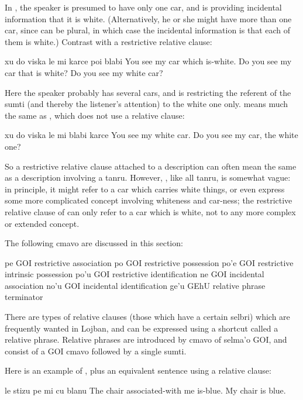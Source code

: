 In , the speaker is presumed
    to have only one car, and is providing incidental information
    that it is white. (Alternatively, he or she might have more
    than one car, since  can be plural, in which case
    the incidental information is that each of them is white.)
    Contrast  with a restrictive
    relative clause:
\begin{example}
xu do viska le mi karce poi blabi\n
{} You see my car which is-white.\n
Do you see my car that is white?\n
Do you see my white car?
\end{example}

Here the speaker probably has several cars, and is restricting
    the referent of the sumti  (and thereby the
    listener's attention) to the white one only.  means much the same as , which does not use a relative
    clause:
\begin{example}
xu do viska le mi blabi karce\n
{} You see my white car.\n
Do you see my car, the white one?
\end{example}

So a restrictive relative clause attached to a description can
    often mean the same as a description involving a tanru.
    However, , like all tanru, is somewhat vague: in
    principle, it might refer to a car which carries white things,
    or even express some more complicated concept involving
    whiteness and car-ness; the restrictive relative clause of  can only refer to a car which is
    white, not to any more complex or extended concept.



The following cmavo are discussed in this section:

   pe  GOI restrictive association
    po  GOI restrictive possession
    po'e    GOI restrictive intrinsic possession
    po'u    GOI restrictive identification
    ne  GOI incidental association
    no'u    GOI incidental identification
    ge'u    GEhU    relative phrase terminator

There are types of relative clauses (those which have a certain
    selbri) which are frequently wanted in Lojban, and can be
    expressed using a shortcut called a relative phrase. Relative
    phrases are introduced by cmavo of selma'o GOI, and consist of
    a GOI cmavo followed by a single sumti. 

Here is an example of , plus an equivalent sentence
    using a relative clause:
\begin{example}
le stizu pe mi cu blanu\n
The chair associated-with me is-blue.\n
My chair is blue.
\end{example}

